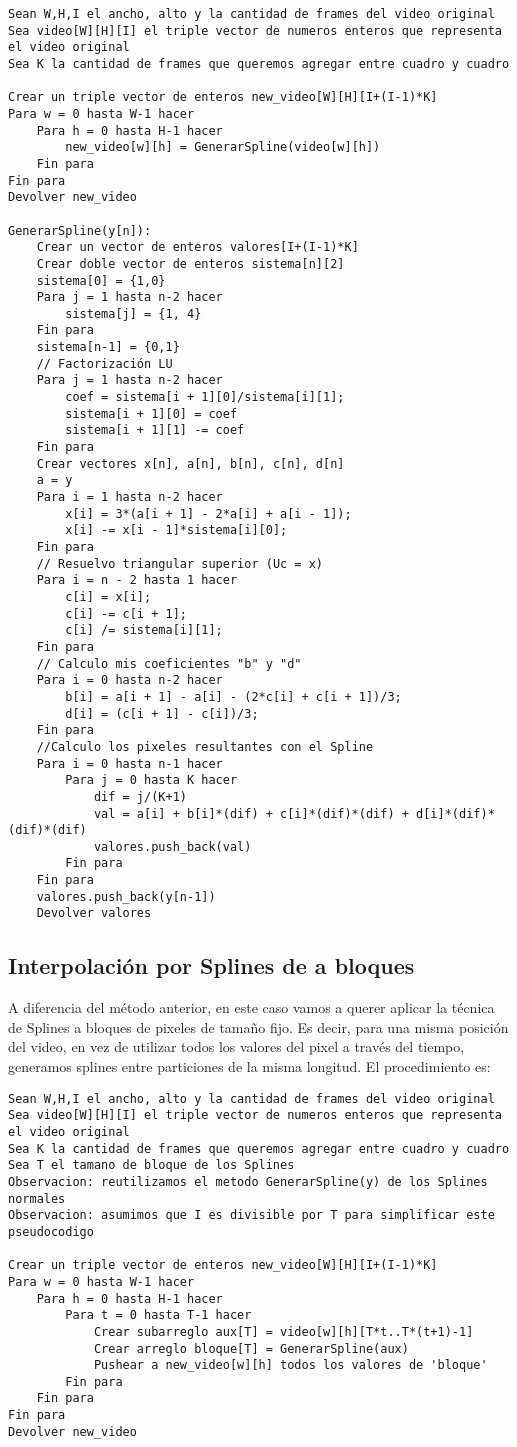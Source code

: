 \begin{lstlisting}
Sean W,H,I el ancho, alto y la cantidad de frames del video original
Sea video[W][H][I] el triple vector de numeros enteros que representa el video original
Sea K la cantidad de frames que queremos agregar entre cuadro y cuadro

Crear un triple vector de enteros new_video[W][H][I+(I-1)*K]
Para w = 0 hasta W-1 hacer
	Para h = 0 hasta H-1 hacer
		new_video[w][h] = GenerarSpline(video[w][h])
	Fin para
Fin para
Devolver new_video

GenerarSpline(y[n]):
	Crear un vector de enteros valores[I+(I-1)*K]
	Crear doble vector de enteros sistema[n][2]
	sistema[0] = {1,0}
	Para j = 1 hasta n-2 hacer
		sistema[j] = {1, 4}
	Fin para
	sistema[n-1] = {0,1}
	// Factorización LU
	Para j = 1 hasta n-2 hacer
		coef = sistema[i + 1][0]/sistema[i][1];
		sistema[i + 1][0] = coef
		sistema[i + 1][1] -= coef
	Fin para
	Crear vectores x[n], a[n], b[n], c[n], d[n]
	a = y
	Para i = 1 hasta n-2 hacer
		x[i] = 3*(a[i + 1] - 2*a[i] + a[i - 1]);
		x[i] -= x[i - 1]*sistema[i][0];
	Fin para
	// Resuelvo triangular superior (Uc = x)
	Para i = n - 2 hasta 1 hacer
		c[i] = x[i];
		c[i] -= c[i + 1];
		c[i] /= sistema[i][1];
	Fin para
	// Calculo mis coeficientes "b" y "d"
	Para i = 0 hasta n-2 hacer
		b[i] = a[i + 1] - a[i] - (2*c[i] + c[i + 1])/3;
		d[i] = (c[i + 1] - c[i])/3;
	Fin para
	//Calculo los pixeles resultantes con el Spline
	Para i = 0 hasta n-1 hacer
		Para j = 0 hasta K hacer
			dif = j/(K+1)
			val = a[i] + b[i]*(dif) + c[i]*(dif)*(dif) + d[i]*(dif)*(dif)*(dif)
			valores.push_back(val)
		Fin para
	Fin para
	valores.push_back(y[n-1])
	Devolver valores
\end{lstlisting}

\subsection{Interpolación por Splines de a bloques}

A diferencia del método anterior, en este caso vamos a querer aplicar la técnica de Splines a bloques de pixeles de tamaño fijo. Es decir, para una misma posición del video, en vez de utilizar todos los valores del pixel a través del tiempo, generamos splines entre particiones de la misma longitud. El procedimiento es:

\begin{lstlisting}
Sean W,H,I el ancho, alto y la cantidad de frames del video original
Sea video[W][H][I] el triple vector de numeros enteros que representa el video original
Sea K la cantidad de frames que queremos agregar entre cuadro y cuadro
Sea T el tamano de bloque de los Splines
Observacion: reutilizamos el metodo GenerarSpline(y) de los Splines normales
Observacion: asumimos que I es divisible por T para simplificar este pseudocodigo

Crear un triple vector de enteros new_video[W][H][I+(I-1)*K]
Para w = 0 hasta W-1 hacer
	Para h = 0 hasta H-1 hacer
		Para t = 0 hasta T-1 hacer
			Crear subarreglo aux[T] = video[w][h][T*t..T*(t+1)-1]
			Crear arreglo bloque[T] = GenerarSpline(aux)
			Pushear a new_video[w][h] todos los valores de 'bloque'
		Fin para
	Fin para
Fin para
Devolver new_video
\end{lstlisting}